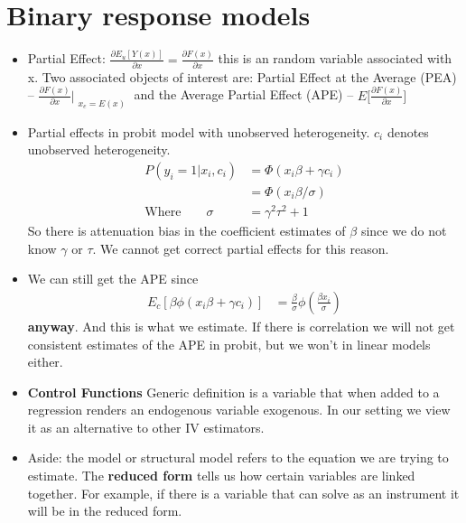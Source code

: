 \documentclass[12pt]{article}
\begin{document}
\section*{Binary response models}
\begin{itemize}
    \item Partial Effect: $ \frac{\partial E_{u}[Y(x)]}{\partial x} =  \frac{\partial F(x)}{\partial x}$ this is an random variable associated with x. Two associated objects of interest are:
          Partial Effect at the Average (PEA) -- $\frac{\partial F(x)}{\partial x}\Bigr|_{\substack{x_{e}=E(x)}}$ and
          the Average Partial Effect (APE) -- $E\big[\frac{\partial F(x)}{\partial x}\big]$
    \item Partial effects in probit model with unobserved heterogeneity. $c_{i}$ denotes unobserved heterogeneity.
          \begin{align*}
              P(y_{i} = 1 | x_{i}, c_{i})     & = \Phi(x_{i}\beta + \gamma c_{i}) \\
                                              & = \Phi(x_{i}\beta / \sigma)       \\
              \text{Where} \quad \quad \sigma & =\gamma^{2}\tau^{2} + 1
          \end{align*}
          So there is attenuation bias in the coefficient estimates of $\beta$ since we do not know $\gamma$ or $\tau$.
          We cannot get correct partial effects for this reason.

    \item We can still get the APE since
          \begin{align*}
              E_{c}[\beta\phi(x_{i}\beta + \gamma c_{i})] & = \frac{\beta}{\sigma}
              \phi(\frac{\beta x_{i}}{\sigma})
          \end{align*}
          \textbf{anyway}. And this is what we estimate.
          If there is correlation we will not get consistent estimates of the APE in probit, but we won't in linear models either.
    \item \textbf{Control Functions}
          Generic definition is a variable that when added to a regression renders an endogenous variable exogenous.
          In our setting we view it as an alternative to other IV estimators.

    \item Aside: the model or structural model refers to the equation we are trying to estimate.
          The \textbf{reduced form} tells us how certain variables are linked together.
          For example, if there is a variable that can solve as an instrument it will be in the reduced form.


\end{itemize}
\end{document}
